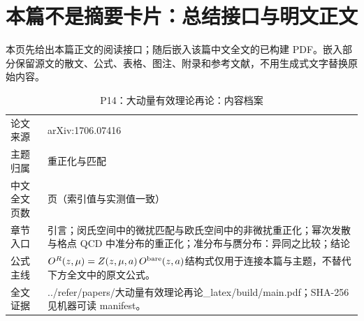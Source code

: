 \documentclass[UTF8,11pt,oneside]{ctexbook}
\begin{document}
\section*{本篇不是摘要卡片：总结接口与明文正文}
本页先给出本篇正文的阅读接口；随后嵌入该篇中文全文的已构建 PDF。嵌入部分保留源文的散文、公式、表格、图注、附录和参考文献，不用生成式文字替换原始内容。
\begin{table}[htbp]
  \centering
  \caption{P14：大动量有效理论再论：内容档案}
  \small
  \begin{tabularx}{0.96\textwidth}{@{}p{3.3cm}>{\raggedright\arraybackslash}X@{}}
    \toprule
    论文来源 & arXiv:1706.07416 \\
    主题归属 & 重正化与匹配 \\
    中文全文页数 & 9 页（索引值与实测值一致） \\
    章节入口 & 引言；闵氏空间中的微扰匹配与欧氏空间中的非微扰重正化；幂次发散与格点 QCD 中准分布的重正化；准分布与赝分布：异同之比较；结论 \\
    公式主线 & $O^{R}(z,\mu)=Z(z,\mu,a)\,O^{\rm bare}(z,a)$\newline\scriptsize 结构式仅用于连接本篇与主题，不替代下方全文中的原文公式。 \\
    全文证据 & ../\allowbreak{}refer/\allowbreak{}papers/\allowbreak{}大动量有效理论再论\_\allowbreak{}latex/\allowbreak{}build/\allowbreak{}main.pdf；SHA-256 见机器可读 manifest。 \\
    \bottomrule
  \end{tabularx}
\end{table}
\end{document}
